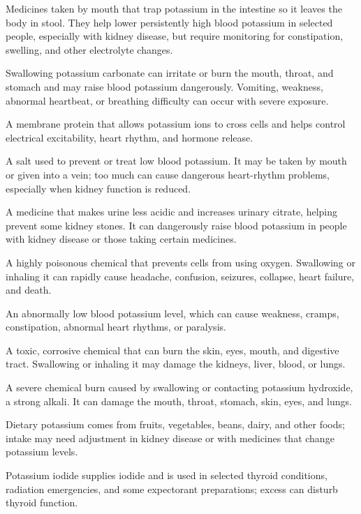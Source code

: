  Medicines taken by mouth that trap potassium in the intestine so it leaves the body in stool. They help lower persistently high blood potassium in selected people, especially with kidney disease, but require monitoring for constipation, swelling, and other electrolyte changes.

 Swallowing potassium carbonate can irritate or burn the mouth, throat, and stomach and may raise blood potassium dangerously. Vomiting, weakness, abnormal heartbeat, or breathing difficulty can occur with severe exposure.

 A membrane protein that allows potassium ions to cross cells and helps control electrical excitability, heart rhythm, and hormone release.

 A salt used to prevent or treat low blood potassium. It may be taken by mouth or given into a vein; too much can cause dangerous heart-rhythm problems, especially when kidney function is reduced.

 A medicine that makes urine less acidic and increases urinary citrate, helping prevent some kidney stones. It can dangerously raise blood potassium in people with kidney disease or those taking certain medicines.

 A highly poisonous chemical that prevents cells from using oxygen. Swallowing or inhaling it can rapidly cause headache, confusion, seizures, collapse, heart failure, and death.

 An abnormally low blood potassium level, which can cause weakness, cramps, constipation, abnormal heart rhythms, or paralysis.

 A toxic, corrosive chemical that can burn the skin, eyes, mouth, and digestive tract. Swallowing or inhaling it may damage the kidneys, liver, blood, or lungs.

 A severe chemical burn caused by swallowing or contacting potassium hydroxide, a strong alkali. It can damage the mouth, throat, stomach, skin, eyes, and lungs.

 Dietary potassium comes from fruits, vegetables, beans, dairy, and other foods; intake may need adjustment in kidney disease or with medicines that change potassium levels.

 Potassium iodide supplies iodide and is used in selected thyroid conditions, radiation emergencies, and some expectorant preparations; excess can disturb thyroid function.

